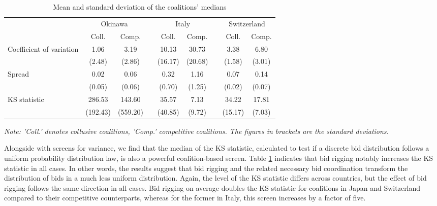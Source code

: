 \documentclass[a4paper,11pt]{article}
\begin{document}
	
	\begin{table}[ht]
		\caption{Mean and standard deviation of the coalitions' medians}\label{Coalitionsmeans}
		\begin{center}
			\begin{tabular}{lcccccccc}
				\hline
				& \multicolumn{2}{c}{Okinawa} & \multicolumn{1}{l}{} & \multicolumn{2}{c}{Italy} & \multicolumn{1}{l}{} & \multicolumn{2}{c}{Switzerland} \\ \cline{2-3} \cline{5-6} \cline{8-9} 
				& Coll.        & Comp.        &                      & Coll.       & Comp.       &                      & Coll.           & Comp.         \\ \hline
				\multirow{2}{*}{Coefficient of variation} & 1.06         & 3.19         &                      & 10.13       & 30.73       &                      & 3.38            & 6.80          \\
				& (2.48)       & (2.86)       &                      & (16.17)     & (20.68)     &                      & (1.58)          & (3.01)        \\
				\multirow{2}{*}{Spread }                                   & 0.02         & 0.06         &                      & 0.32        & 1.16        &                      & 0.07            & 0.14          \\
				& (0.05)       & (0.06)       &                      & (0.70)      & (1.25)      &                      & (0.02)          & (0.07)        \\
				\multirow{2}{*}{KS statistic}              & 286.53       & 143.60       &                      & 35.57       & 7.13        &                      & 34.22           & 17.81         \\
				& (192.43)     & (559.20)     &                      & (40.85)     & (9.72)      &                      & (15.17)         & (7.03)        \\ \hline
			\end{tabular}
		\end{center}
		\par
		\textit{Note: 'Coll.' denotes collusive coalitions, 'Comp.' competitive coalitions. The figures in brackets are the standard deviations.} 
	\end{table}
	
	Alongside with screens for variance, we find that the median of the KS statistic, calculated to test if a discrete bid distribution follows a uniform probability distribution law, is also a powerful coalition-based screen. Table \ref{Coalitionsmeans} indicates that bid rigging notably increases the KS statistic in all cases. In other words, the results suggest that bid rigging and the related necessary bid coordination transform the distribution of bids in a much less uniform distribution. Again, the level of the KS statistic differs across countries, but the effect of bid rigging follows the same direction in all cases. Bid rigging on average doubles the KS statistic for coalitions in Japan and Switzerland compared to their competitive counterparts, whereas for the former in Italy, this screen increases by a factor of five. 
	
\end{document}
